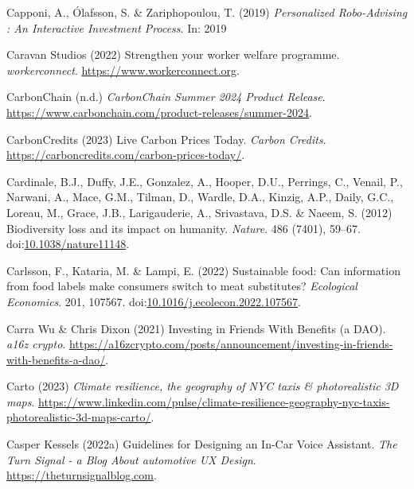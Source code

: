 \documentclass[
  letterpaper,
  DIV=11,
  numbers=noendperiod]{scrartcl}
\newlength{\cslhangindent}
\newenvironment{CSLReferences}[2] %
 {\begin{list}{}{%
  \setlength{\itemindent}{0pt}
  \setlength{\leftmargin}{0pt}
  \setlength{\parsep}{0pt}
  \ifodd #1
   \setlength{\leftmargin}{\cslhangindent}
   \setlength{\itemindent}{-1\cslhangindent}
  \fi
  \setlength{\itemsep}{#2\baselineskip}}}
 {\end{list}}
\begin{document}
\begin{CSLReferences}{0}{1}
Capponi, A., Ólafsson, S. \& Zariphopoulou, T. (2019) \emph{Personalized
{Robo-Advising} : An {Interactive Investment Process}}. In: 2019

Caravan Studios (2022) Strengthen your worker welfare programme.
\emph{workerconnect}. \url{https://www.workerconnect.org}.

CarbonChain (n.d.) \emph{{CarbonChain Summer} 2024 {Product Release}}.
\url{https://www.carbonchain.com/product-releases/summer-2024}.

CarbonCredits (2023) Live {Carbon Prices Today}. \emph{Carbon Credits}.
\url{https://carboncredits.com/carbon-prices-today/}.

Cardinale, B.J., Duffy, J.E., Gonzalez, A., Hooper, D.U., Perrings, C.,
Venail, P., Narwani, A., Mace, G.M., Tilman, D., Wardle, D.A., Kinzig,
A.P., Daily, G.C., Loreau, M., Grace, J.B., Larigauderie, A.,
Srivastava, D.S. \& Naeem, S. (2012) Biodiversity loss and its impact on
humanity. \emph{Nature}. 486 (7401), 59--67.
doi:\href{https://doi.org/10.1038/nature11148}{10.1038/nature11148}.

Carlsson, F., Kataria, M. \& Lampi, E. (2022) Sustainable food: {Can}
information from food labels make consumers switch to meat substitutes?
\emph{Ecological Economics}. 201, 107567.
doi:\href{https://doi.org/10.1016/j.ecolecon.2022.107567}{10.1016/j.ecolecon.2022.107567}.

Carra Wu \& Chris Dixon (2021) Investing in {Friends With Benefits} (a
{DAO}). \emph{a16z crypto}.
\url{https://a16zcrypto.com/posts/announcement/investing-in-friends-with-benefits-a-dao/}.

Carto (2023) \emph{Climate resilience, the geography of {NYC} taxis \&
photorealistic {3D} maps}.
\url{https://www.linkedin.com/pulse/climate-resilience-geography-nyc-taxis-photorealistic-3d-maps-carto/}.

Casper Kessels (2022a) Guidelines for {Designing} an {In-Car Voice
Assistant}. \emph{The Turn Signal - a Blog About automotive UX Design}.
\url{https://theturnsignalblog.com}.


\end{CSLReferences}
\end{document}
